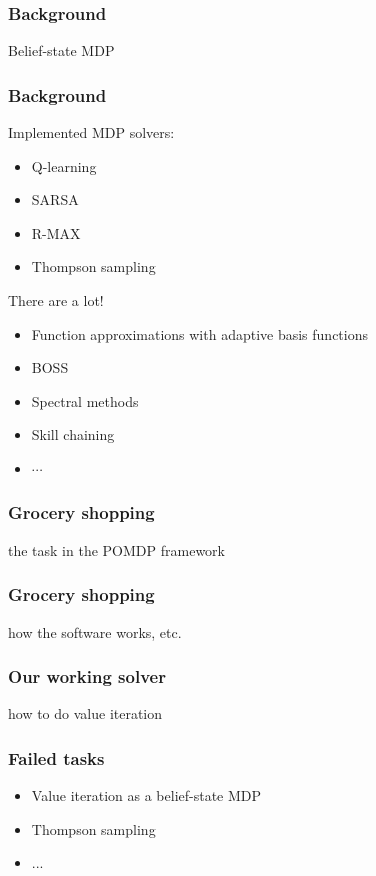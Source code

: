 \documentclass[10pt, compress]{beamer}
\begin{document}
\begin{frame}[fragile]
  \frametitle{Background}
  Belief-state MDP

\end{frame}

\begin{frame}[fragile]
  \frametitle{Background}

  Implemented MDP solvers:
  \begin{itemize}
  \item Q-learning
  \item SARSA
  \item R-MAX
  \item Thompson sampling
  \end{itemize}

  There are a lot!
  \begin{itemize}
  \item Function approximations with adaptive basis functions
  \item BOSS
  \item Spectral methods
  \item Skill chaining
  \item $\cdots$
  \end{itemize}

\end{frame}

\begin{frame}[fragile]
  \frametitle{Grocery shopping}

  the task in the POMDP framework
\end{frame}

\begin{frame}[fragile]
  \frametitle{Grocery shopping}

  how the software works, etc.
\end{frame}


\begin{frame}[fragile]
  \frametitle{Our working solver}

  how to do value iteration
\end{frame}

\begin{frame}[fragile]
  \frametitle{Failed tasks}

  \begin{itemize}
  \item Value iteration as a belief-state MDP
  \item Thompson sampling
  \item ...
  \end{itemize}
\end{frame}
\end{document}
